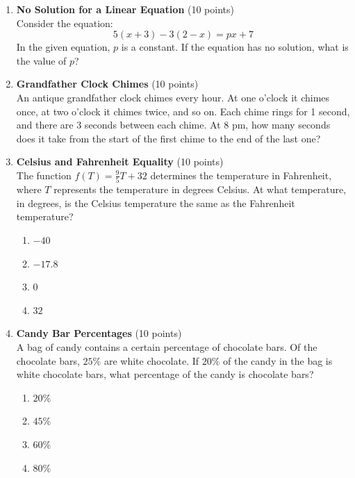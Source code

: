 \begin{enumerate}
  \item \textbf{No Solution for a Linear Equation} (10 points)\\
  Consider the equation:
  \[
    5(x+3) - 3(2-x) = p x + 7
  \]
  In the given equation, $p$ is a constant. If the equation has no solution, what is the value of $p$?
  \begin{subanswer}
  \end{subanswer}


  \item \textbf{Grandfather Clock Chimes} (10 points)\\
  An antique grandfather clock chimes every hour. At one o'clock it chimes once, at two o'clock it chimes twice, and so on. Each chime rings for 1 second, and there are 3 seconds between each chime. At 8 pm, how many seconds does it take from the start of the first chime to the end of the last one?
  \begin{subanswer}
  \end{subanswer}


  \item \textbf{Celsius and Fahrenheit Equality} (10 points)\\
  The function $f(T) = \frac{9}{5}T + 32$ determines the temperature in Fahrenheit, where $T$ represents the temperature in degrees Celsius. At what temperature, in degrees, is the Celsius temperature the same as the Fahrenheit temperature?
  \begin{enumerate}[label=(\Alph*)]
    \item $-40$
    \item $-17.8$
    \item $0$
    \item $32$
  \end{enumerate}
  \begin{subanswer}
  \end{subanswer}
  

  \item \textbf{Candy Bar Percentages} (10 points)\\
  A bag of candy contains a certain percentage of chocolate bars. Of the chocolate bars, $25\%$ are white chocolate. If $20\%$ of the candy in the bag is white chocolate bars, what percentage of the candy is chocolate bars?
  \begin{enumerate}[label=(\Alph*)]
    \item $20\%$
    \item $45\%$
    \item $60\%$
    \item $80\%$
  \end{enumerate}
  \begin{subanswer}
  \end{subanswer}



\end{enumerate}
